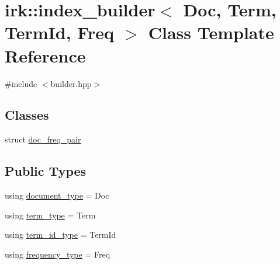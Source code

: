 \hypertarget{classirk_1_1index__builder}{}\section{irk\+:\+:index\+\_\+builder$<$ Doc, Term, Term\+Id, Freq $>$ Class Template Reference}
\label{classirk_1_1index__builder}


{\ttfamily \#include $<$builder.\+hpp$>$}

\subsection*{Classes}
\begin{DoxyCompactItemize}
\item 
struct \mbox{\hyperlink{structirk_1_1index__builder_1_1doc__freq__pair}{doc\+\_\+freq\+\_\+pair}}
\end{DoxyCompactItemize}
\subsection*{Public Types}
\begin{DoxyCompactItemize}
\item 
using \mbox{\hyperlink{classirk_1_1index__builder_a4230ae91e9f84c95ee99b3607c6e952e}{document\+\_\+type}} = Doc
\item 
using \mbox{\hyperlink{classirk_1_1index__builder_ad80a8f10f3e72ed3b9a2f181350f3f1f}{term\+\_\+type}} = Term
\item 
using \mbox{\hyperlink{classirk_1_1index__builder_a6736f4a9aa142d3ca15c5e8c3b0a352f}{term\+\_\+id\+\_\+type}} = Term\+Id
\item 
using \mbox{\hyperlink{classirk_1_1index__builder_af2efa68fc3f10fd9cb000d16279bfbb1}{frequency\+\_\+type}} = Freq
\end{DoxyCompactItemize}
